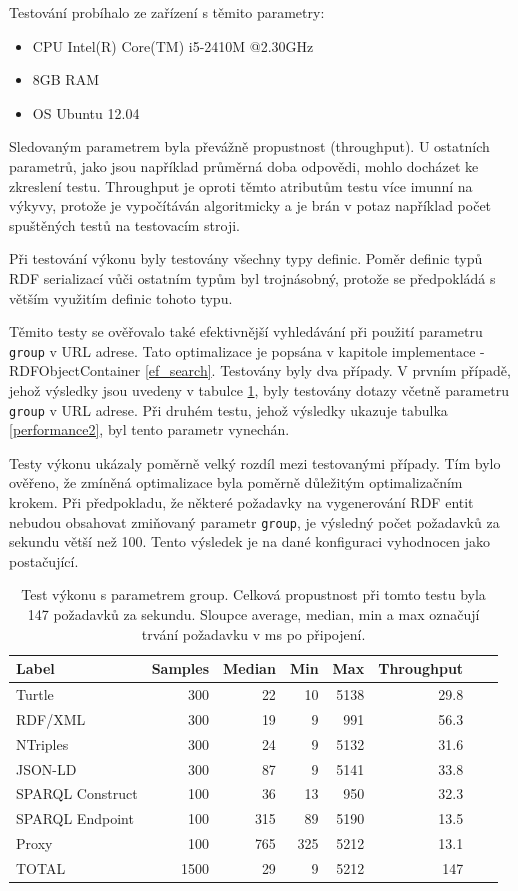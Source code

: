 \documentclass[thesis=B,czech]{FITthesis}[2012/06/26]
\begin{document}
  Testování probíhalo ze zařízení s těmito parametry:
  \begin{itemize}
   \item CPU Intel(R) Core(TM) i5-2410M @2.30GHz
   \item 8GB RAM
   \item OS Ubuntu 12.04
  \end{itemize}
  
  Sledovaným parametrem byla převážně propustnost (throughput). U ostatních parametrů, jako jsou například průměrná doba odpovědi, mohlo docházet ke zkreslení
  testu. Throughput je oproti těmto atributům testu více imunní na výkyvy, protože je vypočítáván algoritmicky a je brán v potaz například počet spuštěných
  testů na testovacím stroji.
  
  
  Při testování výkonu byly testovány všechny typy definic. Poměr definic typů RDF serializací vůči ostatním typům byl trojnásobný, protože se předpokládá
  s větším využitím definic tohoto typu.
  
  Těmito testy se ověřovalo také efektivnější vyhledávání při použití parametru \texttt{group} v URL adrese. 
  Tato optimalizace je popsána v kapitole implementace - RDFObjectContainer \ref{ef_search}.
  Testovány byly dva případy. 
  V prvním případě, jehož výsledky jsou uvedeny v tabulce \ref{performance1}, byly testovány dotazy včetně parametru \texttt{group}
  v URL adrese. Při druhém testu, jehož výsledky ukazuje tabulka \ref{performance2}, byl tento parametr vynechán.
  
  Testy výkonu ukázaly poměrně velký rozdíl mezi testovanými případy. Tím bylo ověřeno, že zmíněná optimalizace byla poměrně důležitým optimalizačním krokem.
  Při předpokladu, že některé požadavky na vygenerování RDF entit nebudou obsahovat zmiňovaný parametr \texttt{group}, je výsledný počet požadavků za sekundu
  větší než 100. Tento výsledek je na dané konfiguraci vyhodnocen jako postačující.
  
    
  \begin{table}\centering
 	\caption[Test výkonu - s parametrem group]{Test výkonu s parametrem group. Celková propustnost při tomto testu byla 147 požadavků za sekundu. Sloupce average, median, min a max označují trvání požadavku v ms po připojení.}\label{performance1}
 	\begin{tabular}{|l|r|r|r|r|r|r|r|}\hline
\textbf{Label}		& 	\textbf{Samples}&		\textbf{Median} &\textbf{Min} &	\textbf{Max} &		\textbf{Throughput} \tabularnewline \hline \hline
 Turtle			&	300	&			22&	10 &	5138&		29.8\tabularnewline \hline
 RDF/XML 		&	300	&			19&	9&	991	&	56.3\tabularnewline \hline
 NTriples 		&	300	&			24&	9&	5132 	&	31.6\tabularnewline \hline
 JSON-LD 		&	300	&			87&	9&	5141 	&	33.8\tabularnewline \hline
 SPARQL Construct 	&	100	&			36&	13&	950 	&	32.3\tabularnewline \hline
 SPARQL Endpoint 	&	100	&			315&	89&	5190 	&	13.5\tabularnewline \hline
 Proxy 			&	100	&			765&	325&	5212 	&	13.1\tabularnewline \hline
TOTAL			&	1500	&			29&	9&	5212 	&	147\tabularnewline \hline
 	\end{tabular}
 \end{table}
 
\end{document}
